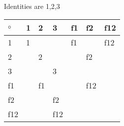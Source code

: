 Identities are 1,2,3
\begin{minipage}{0.48\textwidth}

  \begin{tabular}{|l|l|l|l|l|l|l|}
    \hline
    $\circ$ & 1 & 2  & 3   & f1 & f2  & f12 \\ \hline
    1       & 1 &    &     & f1 &     & f12 \\ \hline
    2       &   & 2  &     &    & f2  &     \\ \hline
    3       &   &    & 3   &    &     &     \\ \hline
    f1      &   & f1 &     &    & f12 &     \\ \hline
    f2      &   &    & f2  &    &     &     \\ \hline
    f12     &   &    & f12 &    &     &     \\ \hline
  \end{tabular}
\end{minipage}
